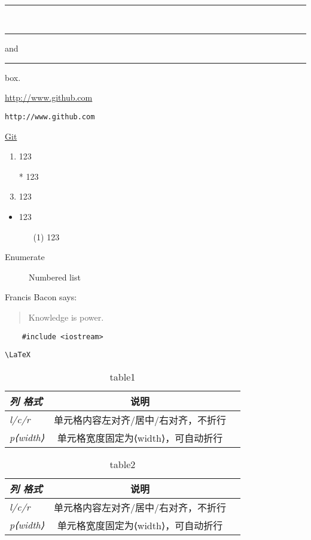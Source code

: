 \documentclass[12pt,oneside,a4paper]{ctexart}
\begin{document}
\\
\rule{4pt}{4pt}\\
\rule[4pt]{6pt}{8pt} and
\rule[-4pt]{6pt}{8pt} box.



\url{http://www.github.com}\par
\nolinkurl{http://www.github.com} \par
\href{http://www.baidu.com}{Git}

		\begin{enumerate}
			\item 123
			\item[*] 123
			\item 123
		\end{enumerate}
	
		\begin{itemize}
			\item 123
			\begin{itemize}
				\item[(1)] 123
			\end{itemize}
		\end{itemize}
	\begin{description}
		\item[Enumerate] Numbered list
	\end{description}

Francis Bacon says:
\begin{quotation}
	Knowledge is power.
\end{quotation}
\begin{verbatim}
	#include <iostream>
\end{verbatim}
\verb|\LaTeX|

\begin{table}[htbp]
	\begin{tabular}{>{\itshape}l<{}|cc}
		\hline 
		列 格式      &    说明&\\
		\hline
		l/c/r       &   单元格内容左对齐/居中/右对齐，不折行&\\
		\cline{2-3}
		p{⟨width⟩}  &   单元格宽度固定为⟨width⟩，可自动折行&\\
		\hline
	\end{tabular}
	\caption{table1}\label{表格1}
\end{table}

\begin{table}[htbp]
	\begin{flushright}
		\begin{tabular}{>{\itshape}l<{}cc}
			\toprule
			列 格式      &    说明&\\
			\midrule
			l/c/r       &   单元格内容左对齐/居中/右对齐，不折行&\\
			p{⟨width⟩}  &   单元格宽度固定为⟨width⟩，可自动折行&\\
			\bottomrule
		\end{tabular}
		\caption{table2}
	\end{flushright}
\end{table}
\end{document}

